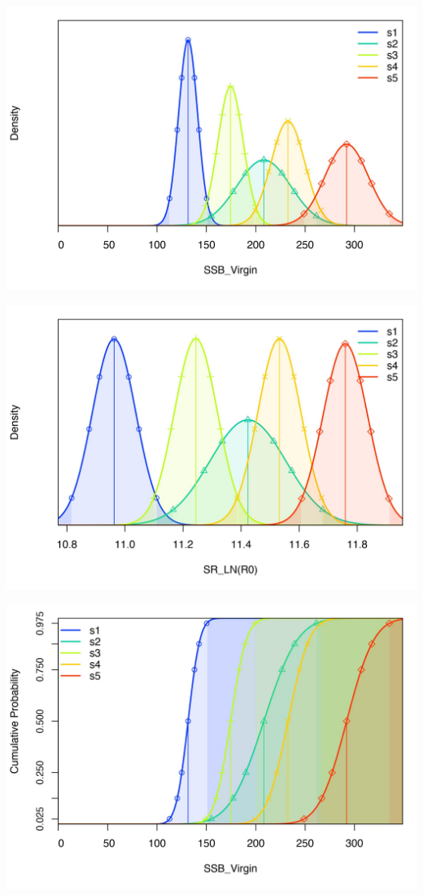 \documentclass[
]{article}
\begin{document}
\begin{center}\includegraphics{Dtrunculus_SS3_2024_files/figure-latex/unnamed-chunk-17-17} \end{center}

\begin{center}\includegraphics{Dtrunculus_SS3_2024_files/figure-latex/unnamed-chunk-17-18} \end{center}

\begin{center}\includegraphics{Dtrunculus_SS3_2024_files/figure-latex/unnamed-chunk-17-19} \end{center}
\end{document}
